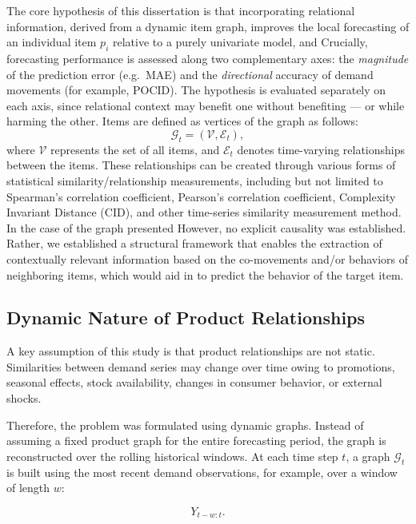 The core hypothesis of this dissertation is that incorporating relational
information, derived from a dynamic item graph, improves the local forecasting of
an individual item $p_i$ relative to a purely univariate model, and Crucially,
forecasting performance is assessed along two complementary axes: the
\emph{magnitude} of the prediction error (e.g.\ MAE) and the \emph{directional}
accuracy of demand movements (for example, POCID). The hypothesis is evaluated separately
on each axis, since relational context may benefit one without benefiting --- or
while harming the other. Items are defined as vertices of the graph as
follows:
\begin{equation}
    \mathcal{G}_t = \left(\mathcal{V}, \mathcal{E}_t\right),
    \label{eq:dynamic_graph}
\end{equation}
where $\mathcal{V}$ represents the set of all items, and $\mathcal{E}_t$ denotes
time-varying relationships between the items. These relationships can be created
through various forms of statistical similarity/relationship measurements,
including but not limited to Spearman's correlation coefficient, Pearson's
correlation coefficient, Complexity Invariant Distance (CID), and other
time-series similarity measurement method. In the case of the graph presented
However, no explicit causality was established. Rather, we established a structural
framework that enables the extraction of contextually relevant information based
on the co-movements and/or behaviors of neighboring items, which would aid in
to predict the behavior of the target item.

\subsection{Dynamic Nature of Product Relationships}
\label{subsec:dynamic_product_relationships}

A key assumption of this study is that product relationships are not static. Similarities between demand series may change over time owing to promotions, seasonal effects, stock availability, changes in consumer behavior, or external shocks.

Therefore, the problem was formulated using dynamic graphs. Instead of assuming a fixed product graph for the entire forecasting period, the graph is reconstructed over the rolling historical windows. At each time step \(t\), a graph \(\mathcal{G}_t\) is built using the most recent demand observations, for example, over a window of length \(w\):

\begin{equation}
    Y_{t-w:t}.
    \label{eq:rolling_window}
\end{equation}


